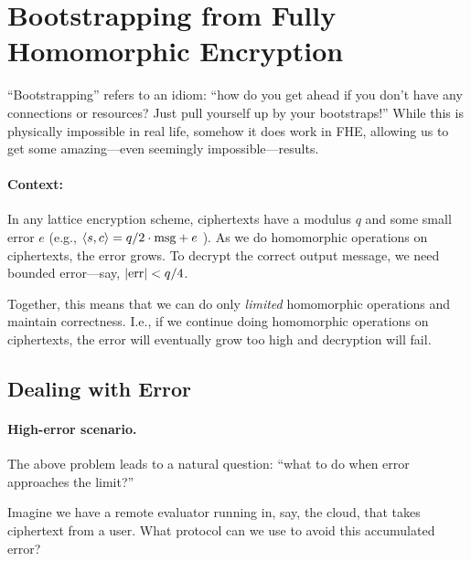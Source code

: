 \documentclass[11pt]{article}
\newcommand*\circled[1]{\tikz[baseline=(char.base)]{
            \node[shape=circle,draw,inner sep=2pt] (char) {#1};}}
\begin{document}
\thispagestyle{fancy}           %



\section{Bootstrapping from Fully Homomorphic Encryption}%
\label{sec:bootstrapping}

``Bootstrapping'' refers to an idiom: ``how do you get ahead if you don't have any connections or resources? Just pull yourself up by your bootstraps!'' While this is physically impossible in real life, somehow it does work in FHE, allowing us to get some amazing---even seemingly impossible---results.

\paragraph{Context:} \circled{1} In any lattice encryption scheme, ciphertexts have a modulus $q$ and some small error $e$ (e.g., $\langle s,c \rangle = q/2 \cdot \textmd{msg} + e$ ).
\circled{2} As we do homomorphic operations on ciphertexts, the error grows.
\circled{3} To decrypt the correct output message, we need bounded error---say, $|\textmd{err}| < q/4$.

\medskip

\noindent Together, this means that we can do only \emph{limited} homomorphic operations and maintain correctness. I.e., if we continue doing homomorphic operations on ciphertexts, the error will eventually grow too high and decryption will fail.

\subsection{Dealing with Error}

\paragraph{High-error scenario.} The above problem leads to a natural question: ``what to do when error approaches the limit?''

\medskip

\noindent Imagine we have a remote evaluator running in, say, the cloud, that takes ciphertext from a user. What protocol can we use to avoid this accumulated error?
\end{document}
